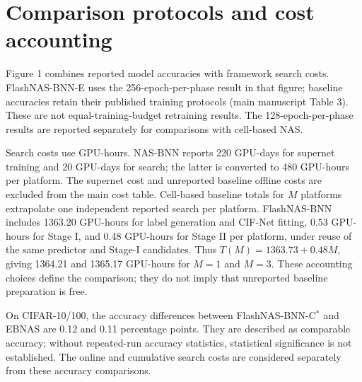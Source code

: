 \documentclass[preprint,review,12p,times]{elsarticle}
\begin{document}
\section{Comparison protocols and cost accounting}
\label{sec:comparison_accounting}
Figure 1 combines reported model accuracies with framework search costs. FlashNAS-BNN-E uses the 256-epoch-per-phase result in that figure; baseline accuracies retain their published training protocols (main manuscript Table 3). These are not equal-training-budget retraining results. The 128-epoch-per-phase results are reported separately for comparisons with cell-based NAS.

Search costs use GPU-hours. NAS-BNN reports 220 GPU-days for supernet training and 20 GPU-days for search; the latter is converted to 480 GPU-hours per platform. The supernet cost and unreported baseline offline costs are excluded from the main cost table. Cell-based baseline totals for $M$ platforms extrapolate one independent reported search per platform. FlashNAS-BNN includes 1363.20 GPU-hours for label generation and CIF-Net fitting, 0.53 GPU-hours for Stage I, and 0.48 GPU-hours for Stage II per platform, under reuse of the same predictor and Stage-I candidates. Thus $T(M)=1363.73+0.48M$, giving 1364.21 and 1365.17 GPU-hours for $M=1$ and $M=3$. These accounting choices define the comparison; they do not imply that unreported baseline preparation is free.

On CIFAR-10/100, the accuracy differences between FlashNAS-BNN-C$^*$ and EBNAS are 0.12 and 0.11 percentage points. They are described as comparable accuracy; without repeated-run accuracy statistics, statistical significance is not established. The online and cumulative search costs are considered separately from these accuracy comparisons.

\FloatBarrier


\end{document}
